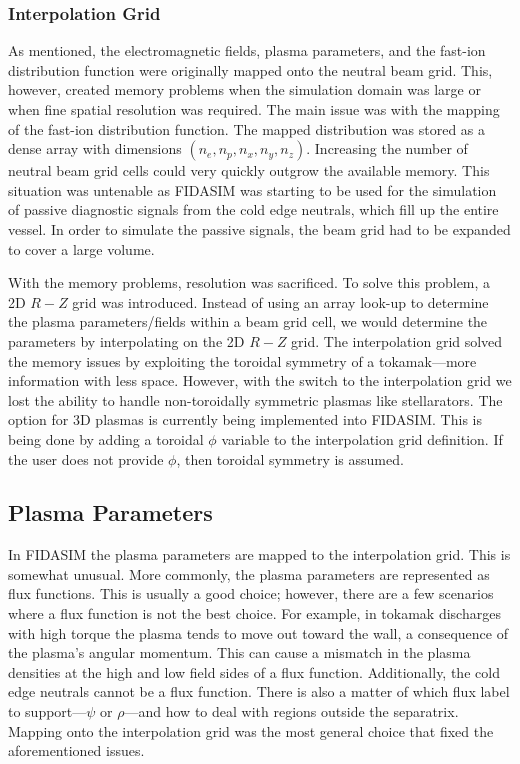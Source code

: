 \subsubsection{Interpolation Grid}
As mentioned, the electromagnetic fields, plasma parameters, and the fast-ion distribution function were originally mapped onto the neutral beam grid. This, however, created memory problems when the simulation domain was large or when fine spatial resolution was required. The main issue was with the mapping of the fast-ion distribution function. The mapped distribution was stored as a dense array with dimensions $(n_e,n_p,n_x,n_y,n_z)$. Increasing the number of neutral beam grid cells could very quickly outgrow the available memory. This situation was untenable as FIDASIM was starting to be used for the simulation of passive diagnostic signals from the cold edge neutrals, which fill up the entire vessel. In order to simulate the passive signals, the beam grid had to be expanded to cover a large volume. 

With the memory problems, resolution was sacrificed. To solve this problem, a 2D $R-Z$ grid was introduced. Instead of using an array look-up to determine the plasma parameters/fields within a beam grid cell, we would determine the parameters by interpolating on the 2D $R-Z$ grid. The interpolation grid solved the memory issues by exploiting the toroidal symmetry of a tokamak---more information with less space. However, with the switch to the interpolation grid we lost the ability to handle non-toroidally symmetric plasmas like stellarators. The option for 3D plasmas is currently being implemented into FIDASIM. This is being done by adding a toroidal $\phi$ variable to the interpolation grid definition. If the user does not provide $\phi$, then toroidal symmetry is assumed.

\subsection{Plasma Parameters}
In FIDASIM the plasma parameters are mapped to the interpolation grid. This is somewhat unusual. More commonly, the plasma parameters are represented as flux functions. This is usually a good choice; however, there are a few scenarios where a flux function is not the best choice. For example, in tokamak discharges with high torque the plasma tends to move out toward the wall, a consequence of the plasma's angular momentum. This can cause a mismatch in the plasma densities at the high and low field sides of a flux function. Additionally, the cold edge neutrals cannot be a flux function. There is also a matter of which flux label to support---$\psi$ or $\rho$---and how to deal with regions outside the separatrix. Mapping onto the interpolation grid was the most general choice that fixed the aforementioned issues.

